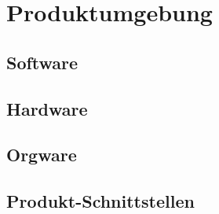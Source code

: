 \chapter{Produktumgebung}
\label{ch:prumgebung}

\section{Software}
\section{Hardware}
\section{Orgware}
\section{Produkt-Schnittstellen}